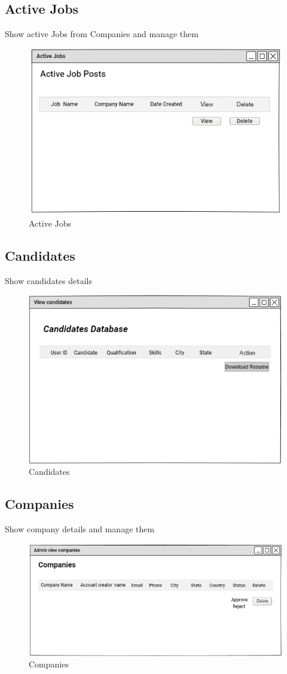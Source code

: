 \documentclass[a4paper,12pt]{report}
\begin{document}
\subsection {Active Jobs}
Show active Jobs from Companies and manage them
\begin{figure}[bph]
	\centering
	\includegraphics[width=.6\linewidth]{img/admin/adminavtvejobs}
	\caption{Active Jobs}
\end{figure}

\subsection {Candidates}
Show candidates details
\begin{figure}[bph]
	\centering
	\includegraphics[width=.6\linewidth]{img/admin/adminviewcandidts}
	\caption{Candidates}
\end{figure}
\pagebreak

\subsection {Companies}
Show company details and manage them
\begin{figure}[bph]
	\centering
	\includegraphics[width=.8\linewidth]{img/admin/adminviewcmpny}
	\caption{Companies}
\end{figure}
\end{document}

